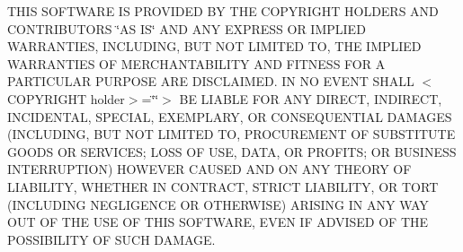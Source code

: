 T\+H\+I\+S S\+O\+F\+T\+W\+A\+R\+E I\+S P\+R\+O\+V\+I\+D\+E\+D B\+Y T\+H\+E C\+O\+P\+Y\+R\+I\+G\+H\+T H\+O\+L\+D\+E\+R\+S A\+N\+D C\+O\+N\+T\+R\+I\+B\+U\+T\+O\+R\+S \char`\"{}\+A\+S I\+S\char`\"{} A\+N\+D A\+N\+Y E\+X\+P\+R\+E\+S\+S O\+R I\+M\+P\+L\+I\+E\+D W\+A\+R\+R\+A\+N\+T\+I\+E\+S, I\+N\+C\+L\+U\+D\+I\+N\+G, B\+U\+T N\+O\+T L\+I\+M\+I\+T\+E\+D T\+O, T\+H\+E I\+M\+P\+L\+I\+E\+D W\+A\+R\+R\+A\+N\+T\+I\+E\+S O\+F M\+E\+R\+C\+H\+A\+N\+T\+A\+B\+I\+L\+I\+T\+Y A\+N\+D F\+I\+T\+N\+E\+S\+S F\+O\+R A P\+A\+R\+T\+I\+C\+U\+L\+A\+R P\+U\+R\+P\+O\+S\+E A\+R\+E D\+I\+S\+C\+L\+A\+I\+M\+E\+D. I\+N N\+O E\+V\+E\+N\+T S\+H\+A\+L\+L $<$\+C\+O\+P\+Y\+R\+I\+G\+H\+T holder$>$=\char`\"{}\char`\"{}$>$ B\+E L\+I\+A\+B\+L\+E F\+O\+R A\+N\+Y D\+I\+R\+E\+C\+T, I\+N\+D\+I\+R\+E\+C\+T, I\+N\+C\+I\+D\+E\+N\+T\+A\+L, S\+P\+E\+C\+I\+A\+L, E\+X\+E\+M\+P\+L\+A\+R\+Y, O\+R C\+O\+N\+S\+E\+Q\+U\+E\+N\+T\+I\+A\+L D\+A\+M\+A\+G\+E\+S (I\+N\+C\+L\+U\+D\+I\+N\+G, B\+U\+T N\+O\+T L\+I\+M\+I\+T\+E\+D T\+O, P\+R\+O\+C\+U\+R\+E\+M\+E\+N\+T O\+F S\+U\+B\+S\+T\+I\+T\+U\+T\+E G\+O\+O\+D\+S O\+R S\+E\+R\+V\+I\+C\+E\+S; L\+O\+S\+S O\+F U\+S\+E, D\+A\+T\+A, O\+R P\+R\+O\+F\+I\+T\+S; O\+R B\+U\+S\+I\+N\+E\+S\+S I\+N\+T\+E\+R\+R\+U\+P\+T\+I\+O\+N) H\+O\+W\+E\+V\+E\+R C\+A\+U\+S\+E\+D A\+N\+D O\+N A\+N\+Y T\+H\+E\+O\+R\+Y O\+F L\+I\+A\+B\+I\+L\+I\+T\+Y, W\+H\+E\+T\+H\+E\+R I\+N C\+O\+N\+T\+R\+A\+C\+T, S\+T\+R\+I\+C\+T L\+I\+A\+B\+I\+L\+I\+T\+Y, O\+R T\+O\+R\+T (I\+N\+C\+L\+U\+D\+I\+N\+G N\+E\+G\+L\+I\+G\+E\+N\+C\+E O\+R O\+T\+H\+E\+R\+W\+I\+S\+E) A\+R\+I\+S\+I\+N\+G I\+N A\+N\+Y W\+A\+Y O\+U\+T O\+F T\+H\+E U\+S\+E O\+F T\+H\+I\+S S\+O\+F\+T\+W\+A\+R\+E, E\+V\+E\+N I\+F A\+D\+V\+I\+S\+E\+D O\+F T\+H\+E P\+O\+S\+S\+I\+B\+I\+L\+I\+T\+Y O\+F S\+U\+C\+H D\+A\+M\+A\+G\+E. 